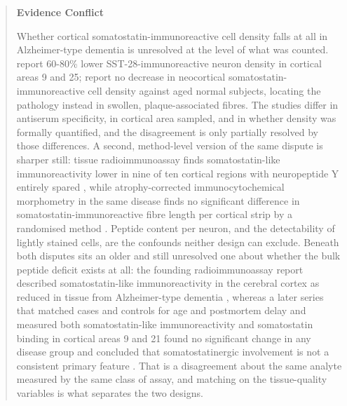 \documentclass[11pt]{article}
\begin{document}
\begin{quote}
\noindent\textbf{Evidence Conflict}\par
Whether cortical somatostatin-immunoreactive cell density falls at all in Alzheimer-type dementia is unresolved at the level of what was counted. \citet{Gaspar1989} report 60-80\% lower SST-28-immunoreactive neuron density in cortical areas 9 and 25; \citet{Nakamura1986} report no decrease in neocortical somatostatin-immunoreactive cell density against aged normal subjects, locating the pathology instead in swollen, plaque-associated fibres. The studies differ in antiserum specificity, in cortical area sampled, and in whether density was formally quantified, and the disagreement is only partially resolved by those differences. A second, method-level version of the same dispute is sharper still: tissue radioimmunoassay finds somatostatin-like immunoreactivity lower in nine of ten cortical regions with neuropeptide Y entirely spared \citep{Gabriel1993}, while atrophy-corrected immunocytochemical morphometry in the same disease finds no significant difference in somatostatin-immunoreactive fibre length per cortical strip by a randomised method \citep{Davies1990}. Peptide content per neuron, and the detectability of lightly stained cells, are the confounds neither design can exclude. Beneath both disputes sits an older and still unresolved one about whether the bulk peptide deficit exists at all: the founding radioimmunoassay report described somatostatin-like immunoreactivity in the cerebral cortex as reduced in tissue from Alzheimer-type dementia \citep{Davies1980}, whereas a later series that matched cases and controls for age and postmortem delay and measured both somatostatin-like immunoreactivity and somatostatin binding in cortical areas 9 and 21 found no significant change in any disease group and concluded that somatostatinergic involvement is not a consistent primary feature \citep{Whitford1988}. That is a disagreement about the same analyte measured by the same class of assay, and matching on the tissue-quality variables is what separates the two designs.

\end{quote}
\end{document}
